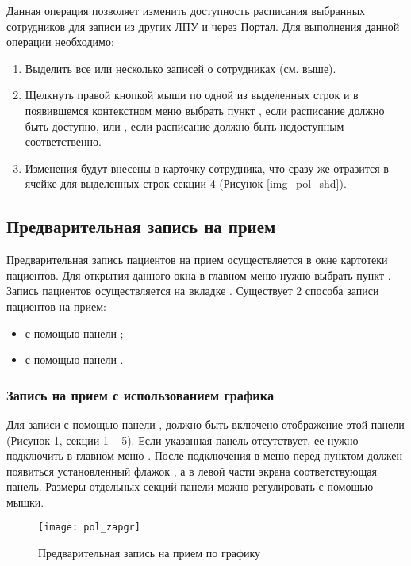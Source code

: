 Данная операция позволяет изменить доступность расписания выбранных сотрудников для записи из других ЛПУ и через Портал. Для выполнения данной операции необходимо:
\begin{enumerate}
 \item Выделить все или несколько записей о сотрудниках (см. выше).
 \item Щелкнуть правой кнопкой мыши по одной из выделенных строк и в появившемся контекстном меню выбрать пункт , если расписание должно быть доступно, или , если расписание должно быть недоступным соответственно.
 \item Изменения будут внесены в карточку сотрудника, что сразу же отразится в ячейке  для выделенных строк секции 4 (Рисунок \ref{img_pol_shd}).
\end{enumerate}

\subsection{Предварительная запись на прием}

Предварительная запись пациентов на прием осуществляется в окне картотеки пациентов. Для открытия данного окна в главном меню нужно выбрать пункт . Запись пациентов осуществляется на вкладке .
Существует 2 способа записи пациентов на прием:
\begin{itemize}
 \item с помощью панели ;
 \item с помощью панели .
\end{itemize}

\subsubsection{Запись на прием с использованием графика}

Для записи с помощью панели , должно быть включено отображение этой панели (Рисунок \ref{img_pol_zapgr}, секции 1 – 5). Если указанная панель отсутствует, ее нужно подключить в главном меню . После подключения в меню перед пунктом  должен появиться установленный флажок \putx, а в левой части экрана соответствующая панель. Размеры отдельных секций панели можно регулировать с помощью мышки.

\begin{figure}[ht]\centering
 \texttt{[image: pol\_zapgr]}
 \caption{Предварительная запись на прием по графику}
 \label{img_pol_zapgr}
\end{figure}  

